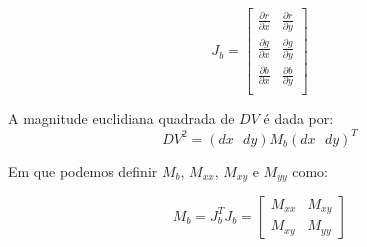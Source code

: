 \begin{equation}
J_b = \begin{bmatrix}
\frac{\partial r}{\partial x} & \frac{\partial r}{\partial y} \\
\frac{\partial g}{\partial x} & \frac{\partial g}{\partial y} \\
\frac{\partial b}{\partial x} & \frac{\partial b}{\partial y} \\
\end{bmatrix}
\end{equation}

A magnitude euclidiana quadrada de $DV $ é dada por:
\begin{equation}
DV^2 = (dx \text{ } dy)M_b(dx \text{ } dy)^T
\end{equation}

Em que podemos definir $M_b$, $M_{xx}$, $M_{xy}$ e $M_{yy}$ como:

\begin{equation}
M_b = J_b^TJ_b = \begin{bmatrix} M_{xx} & M_{xy} \\ M_{xy} & M_{yy} \end{bmatrix}
\end{equation}


